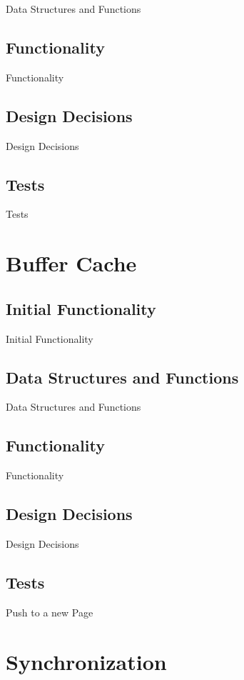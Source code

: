 Data Structures and Functions

\subsection{Functionality}
  
Functionality

\subsection{Design Decisions}
  
Design Decisions

\subsection{Tests}

Tests

\section{Buffer Cache}
\subsection{Initial Functionality}

Initial Functionality
  

\subsection{Data Structures and Functions}
  
Data Structures and Functions

\subsection{Functionality}
  
Functionality

\subsection{Design Decisions}
  
Design Decisions

\subsection{Tests}

Push to a new Page

\section{Synchronization}
